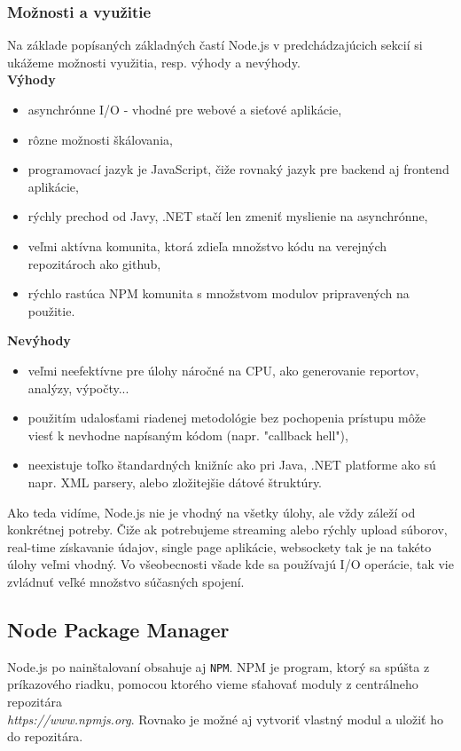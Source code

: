 \subsubsection{Možnosti a využitie}
Na základe popísaných základných častí Node.js v predchádzajúcich sekcií si ukážeme možnosti využitia, resp. výhody a nevýhody.\cite{nodejs-arch}\\

\noindent \textbf{Výhody}
\begin{itemize}
\item asynchrónne I/O - vhodné pre webové a sieťové aplikácie,
\item rôzne možnosti škálovania,
\item programovací jazyk je JavaScript, čiže rovnaký jazyk pre backend aj frontend aplikácie,
\item rýchly prechod od Javy, .NET stačí len zmeniť myslienie na asynchrónne,
\item veľmi aktívna komunita, ktorá zdieľa množstvo kódu na verejných repozitároch ako github,
\item rýchlo rastúca NPM komunita s množstvom modulov pripravených na použitie.
\end{itemize}

\noindent \textbf{Nevýhody}
\begin{itemize}
\item veľmi neefektívne pre úlohy náročné na CPU, ako generovanie reportov, analýzy, výpočty...
\item použitím udalosťami riadenej metodológie bez pochopenia prístupu môže viesť k nevhodne napísaným kódom (napr. "callback hell"),
\item neexistuje toľko štandardných knižníc ako pri Java, .NET platforme ako sú napr. XML parsery, alebo zložitejšie dátové štruktúry.
\end{itemize}

Ako teda vidíme, Node.js nie je vhodný na všetky úlohy, ale vždy záleží od konkrétnej potreby. Čiže ak potrebujeme streaming alebo rýchly upload súborov, real-time získavanie údajov, single page aplikácie, websockety tak je na takéto úlohy veľmi vhodný. Vo všeobecnosti všade kde sa používajú I/O operácie, tak vie zvládnuť veľké množstvo súčasných spojení.\cite{nodejs-introduction}

\subsection{Node Package Manager}
Node.js po nainštalovaní obsahuje aj \verb|NPM|. NPM je program, ktorý sa spúšta z príkazového riadku, pomocou ktorého vieme sťahovať moduly z centrálneho repozitára\\ \textit{https://www.npmjs.org}. Rovnako je možné aj vytvoriť vlastný modul a uložiť ho do repozitára.

